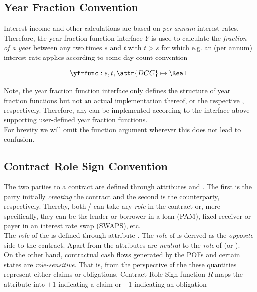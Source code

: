 \subsection{Year Fraction Convention}\label{sec:yearfrac}

Interest income and other calculations are based on \textit{per annum} interest rates. Therefore, the year-fraction function interface $Y$ is used to calculate the \textit{fraction of a year} between any two times $s$ and $t$ with $t>s$ for which e.g. an (per annum) interest rate applies according to some day count convention 

\[
	\yfrfunc: s,t,\attr{DCC} \mapsto \Real
\]

Note, the year fraction function interface only defines the structure of year fraction functions but not an actual implementation thereof, or the respective , respectively. Therefore, any  can be implemented according to the interface above supporting user-defined year fraction functions.\\

For brevity we will omit the  function argument wherever this does not lead to confusion.


\subsection{Contract Role Sign Convention}\label{sec:cntrl}

The two parties to a contract are defined through attributes  and . The first is the party initially \textit{creating} the contract and the second is the counterparty, respectively. Thereby, both / can take any \textit{role} in the contract or, more specifically, they can be the lender or borrower in a loan (PAM), fixed receiver or payer in an interest rate swap (SWAPS), etc.\\

The \textit{role} of the  is defined through attribute . The \textit{role} of  is derived as the \textit{opposite} side to the contract. Apart from  the attributes are \textit{neutral} to the \textit{role} of  (or ).\\

On the other hand, contractual cash flows generated by the POFs and certain states are \textit{role-sensitive}. That is, from the perspective of the  these quantities represent either claims or obligations. Contract Role Sign function $R$ maps the  attribute into $+1$ indicating a claim or $-1$ indicating an obligation

